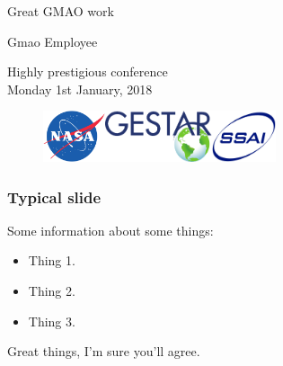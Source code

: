 \documentclass[aspectratio=43]{beamer}
\begin{document}

{

\begin{frame} 

\vspace{5mm}
\begin{center}
{\Large {\titlecolor Great GMAO work} } 
\end{center}

\vspace{-5mm}
\begin{center}
Gmao Employee 
\end{center}

\begin{center}
\footnotesize{Highly prestigious conference \\ Monday 1st January, 2018}
\end{center}

\vspace{0.25mm}

\begin{center}
\begin{figure}
\includegraphics[height=1.5cm]{nasa.png}\hspace{1.5cm}\includegraphics[height=1.5cm]{GESTAR.pdf}\hspace{1.5cm}\includegraphics[height=1.5cm]{SSAI.jpg}
\end{figure}
\end{center}

\end{frame}
}


\begin{frame}\frametitle{Typical slide}

Some information about some things:

\begin{itemize}
\item Thing 1.
\item Thing 2.
\item Thing 3.
\end{itemize}

Great things, I'm sure you'll agree.

\end{frame}


\end{document}
